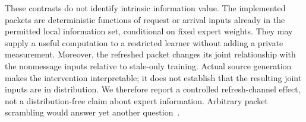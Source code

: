 These contrasts do not identify intrinsic information value. The implemented packets are deterministic functions of request or arrival inputs already in the permitted local information set, conditional on fixed expert weights. They may supply a useful computation to a restricted learner without adding a private measurement. Moreover, the refreshed packet changes its joint relationship with the nonmessage inputs relative to stale-only training. Actual source generation makes the intervention interpretable; it does not establish that the resulting joint inputs are in distribution. We therefore report a controlled refresh-channel effect, not a distribution-free claim about expert information. Arbitrary packet scrambling would answer yet another question~\cite{hooker,strobl}.
